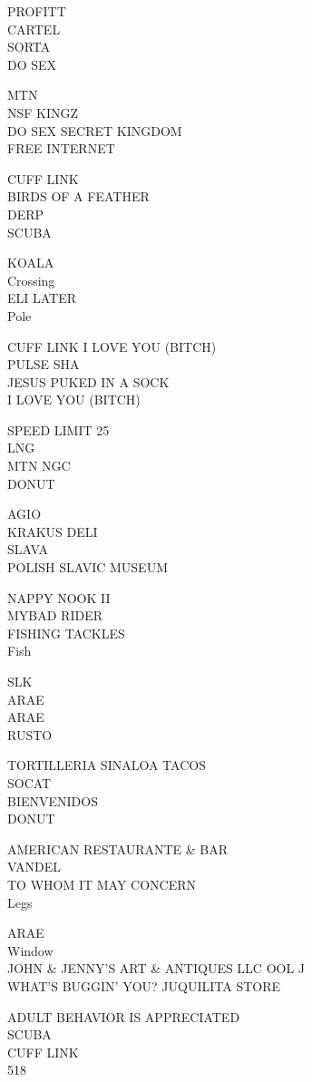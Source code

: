 \documentclass[10pt,letterpaper]{article}
\begin{document}
PROFITT\\
CARTEL\\
SORTA\\
DO SEX

MTN\\
NSF KINGZ\\
DO SEX SECRET KINGDOM\\
FREE INTERNET

CUFF LINK\\
BIRDS OF A FEATHER\\
DERP\\
SCUBA

KOALA\\
Crossing\\
ELI LATER\\
Pole

CUFF LINK I LOVE YOU (BITCH)\\
PULSE SHA\\
JESUS PUKED IN A SOCK\\
I LOVE YOU (BITCH)

SPEED LIMIT 25\\
LNG\\
MTN NGC\\
DONUT

AGIO\\
KRAKUS DELI\\
SLAVA\\
POLISH SLAVIC MUSEUM

NAPPY NOOK II\\
MYBAD RIDER\\
FISHING TACKLES\\
Fish

SLK\\
ARAE\\
ARAE\\
RUSTO

TORTILLERIA SINALOA TACOS\\
SOCAT\\
BIENVENIDOS\\
DONUT

AMERICAN RESTAURANTE \& BAR\\
VANDEL\\
TO WHOM IT MAY CONCERN\\
Legs

ARAE\\
Window\\
JOHN \& JENNY'S ART \& ANTIQUES LLC OOL J\\
WHAT'S BUGGIN' YOU? JUQUILITA STORE

ADULT BEHAVIOR IS APPRECIATED\\
SCUBA\\
CUFF LINK\\
518
\end{document}
